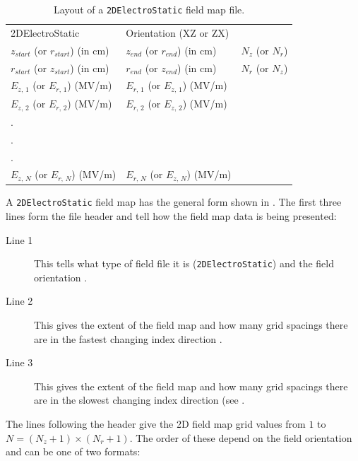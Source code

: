 \begin{table}[ht!]
    \caption{Layout of a \texttt{2DElectroStatic} field map file.}
    \label{tab:2DElectroStatic}
    \begin{center}
    \begin{tabular}{lll}
      \hline
      2DElectroStatic & Orientation (XZ or ZX) & \\
      $z_{start}$ (or $r_{start}$) (in cm) & $z_{end}$ (or $r_{end}$) (in cm) & $N_{z}$ (or $N_{r}$) \\
      $r_{start}$ (or $z_{start}$) (in cm) & $r_{end}$ (or $z_{end}$) (in cm) & $N_{r}$ (or $N_{z}$) \\
      $E_{z,\,1}$ (or $E_{r,\,1}$) (MV/m) & $E_{r,\,1}$ (or $E_{z,\,1}$) (MV/m)& \\
      $E_{z,\,2}$ (or $E_{r,\,2}$) (MV/m) & $E_{r,\,2}$ (or $E_{z,\,2}$) (MV/m)& \\
      . & & \\
      . & & \\
      . & & \\
      $E_{z,\,N}$ (or $E_{r,\,N}$) (MV/m) & $E_{r,\,N}$ (or $E_{z,\,N}$) (MV/m)& \\
      \hline
    \end{tabular}
    \end{center}
\end{table}

A \texttt{2DElectroStatic} field map has the general form shown in . The first three lines form
the file header and tell \opalt how the field map data is being presented:

\begin{description}
\item[Line 1] This tells \opalt what type of field file it is (\texttt{2DElectroStatic}) and the field orientation
  .
\item[Line 2] This gives the extent of the field map and how many grid spacings there are in the fastest changing
  index direction .
\item[Line 3] This gives the extent of the field map and how many grid spacings there are in the slowest changing
  index direction (see .
\end{description}

The lines following the header give the 2D field map grid values from $1$ to $N = (N_{z} + 1) \times (N_{r} + 1)$.
The order of these depend on the field orientation  and can be one of two formats:

